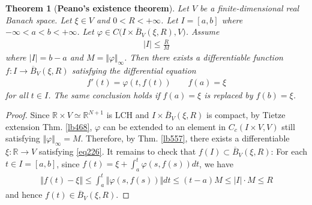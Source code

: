 \documentclass[12pt,b5paper,notitlepage]{article}
\theoremstyle{definition}
\theoremstyle{plain}
\newtheorem{thm}[df]{Theorem}
\newcommand{\ovl}{\overline}
\newcommand{\Rbb}{\mathbb R}
\numberwithin{equation}{section}
\begin{document}
\begin{thm}[\textbf{Peano's existence theorem}]
Let $V$ be a finite-dimensional real Banach space. Let $\xi\in V$ and $0<R<+\infty$. Let $I=[a,b]$ where $-\infty<a<b<+\infty$. Let $\varphi \in C\big(I\times\ovl B_V(\xi,R),V\big)$. Assume
\begin{align}
|I|\leq \frac RM  
\end{align} 
where $|I|=b-a$ and $M=\Vert\varphi\Vert_\infty$. Then there exists a differentiable function $f:I\rightarrow \ovl B_V(\xi,R)$ satisfying the differential equation
\begin{align}
f'(t)=\varphi(t,f(t))\qquad f(a)=\xi  \label{eq226}
\end{align}
for all $t\in I$. The same conclusion holds if $f(a)=\xi$ is replaced by $f(b)=\xi$.
\end{thm}


\begin{proof}
Since $\Rbb\times V\simeq \Rbb^{N+1}$ is LCH and $I\times \ovl B_V(\xi,R)$ is compact, by Tietze extension Thm. \ref{lb468}, $\varphi$ can be extended to an element in $C_c(I\times V,V)$ still satisfying $\Vert\varphi\Vert_\infty=M$. Therefore, by Thm. \ref{lb557}, there exists a differentiable $\xi:\Rbb\rightarrow V$ satisfying \eqref{eq226}. It remains to check that $f(I)\subset \ovl B_V(\xi, R)$: For each $t\in I=[a,b]$, since $f(t)=\xi+\int_a^t\varphi(s,f(s))dt$, we have
\begin{align*}
\Vert f(t)-\xi\Vert\leq\int_a^t\Vert\varphi(s,f(s))\Vert dt\leq (t-a)M\leq |I|\cdot M\leq R
\end{align*}
and hence $f(t)\in \ovl B_V(\xi,R)$.
\end{proof}















\hypertarget{beforeindex}{}













\newpage

\printindex	
\end{document}
